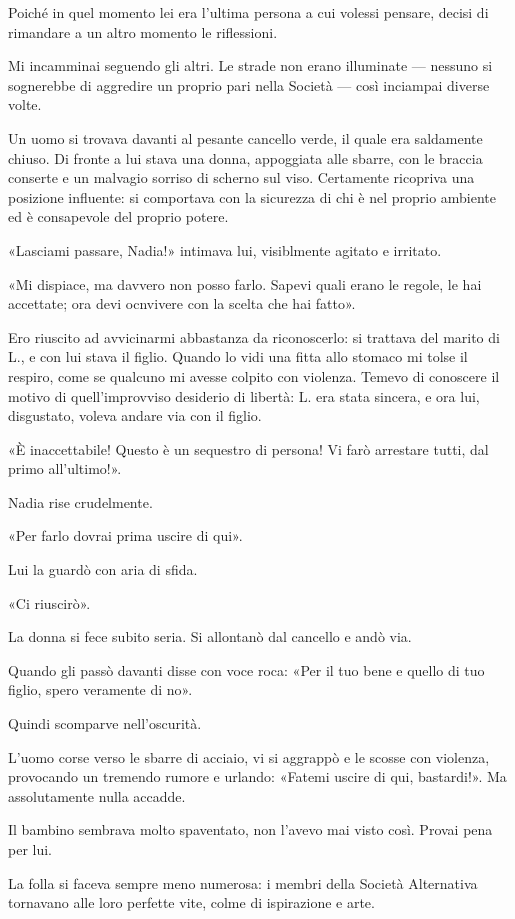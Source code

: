 \documentclass[a4paper,12pt]{book}
\begin{document}
Poiché in quel momento lei era l'ultima persona a cui volessi pensare, decisi di
rimandare a un altro momento le riflessioni.

Mi incamminai seguendo gli altri. Le strade non erano illuminate --- nessuno si
sognerebbe di aggredire un proprio pari nella Società --- così inciampai diverse
volte.

Un uomo si trovava davanti al pesante cancello verde, il quale era saldamente
chiuso. Di fronte a lui stava una donna, appoggiata alle sbarre, con le braccia
conserte e un malvagio sorriso di scherno sul viso. Certamente ricopriva una
posizione influente: si comportava con la sicurezza di chi è nel proprio
ambiente ed è consapevole del proprio potere.

«Lasciami passare, Nadia!» intimava lui, visiblmente agitato e irritato.

«Mi dispiace, ma davvero non posso farlo. Sapevi quali erano le regole, le hai
accettate; ora devi ocnvivere con la scelta che hai fatto».

Ero riuscito ad avvicinarmi abbastanza da riconoscerlo: si trattava del marito
di L., e con lui stava il figlio. Quando lo vidi una fitta allo stomaco mi
tolse il respiro, come se qualcuno mi avesse colpito con violenza. Temevo di
conoscere il motivo di quell'improvviso desiderio di libertà: L. era stata
sincera, e ora lui, disgustato, voleva andare via con il figlio.

«È inaccettabile! Questo è un sequestro di persona! Vi farò arrestare tutti, dal
primo all'ultimo!».

Nadia rise crudelmente.

«Per farlo dovrai prima uscire di qui».

Lui la guardò con aria di sfida.

«Ci riuscirò».

La donna si fece subito seria. Si allontanò dal cancello e andò via.

Quando gli passò davanti disse con voce roca: «Per il tuo bene e quello di tuo
figlio, spero veramente di no».

Quindi scomparve nell'oscurità.

L'uomo corse verso le sbarre di acciaio, vi si aggrappò e le scosse con
violenza, provocando un tremendo rumore e urlando: «Fatemi uscire di qui,
bastardi!». Ma assolutamente nulla accadde.

Il bambino sembrava molto spaventato, non l'avevo mai visto così. Provai pena
per lui.

La folla si faceva sempre meno numerosa: i membri della Società Alternativa
tornavano alle loro perfette vite, colme di ispirazione e arte.
\end{document}
